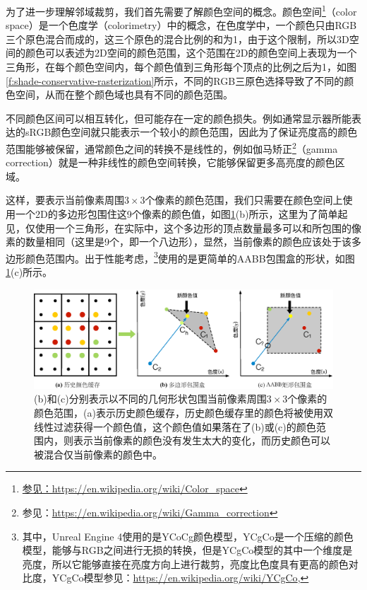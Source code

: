为了进一步理解邻域裁剪，我们首先需要了解颜色空间的概念。颜色空间\footnote{\url{参见：https://en.wikipedia.org/wiki/Color_space}}（color space）是一个色度学（colorimetry）中的概念，在色度学中，一个颜色只由RGB三个原色混合而成的，这三个原色的混合比例的和为1，由于这个限制，所以3D空间的颜色可以表述为2D空间的颜色范围，这个范围在2D的颜色空间上表现为一个三角形，在每个颜色空间内，每个颜色值到三角形每个顶点的比例之后为1，如图\ref{f:shade-conservative-rasterization}所示，不同的RGB三原色选择导致了不同的颜色空间，从而在整个颜色域也具有不同的颜色范围。

不同颜色区间可以相互转化，但可能存在一定的颜色损失。例如通常显示器所能表达的sRGB颜色空间就只能表示一个较小的颜色范围，因此为了保证亮度高的颜色范围能够被保留，通常颜色之间的转换不是线性的，例如伽马矫正\footnote{参见：\url{https://en.wikipedia.org/wiki/Gamma_correction}}（gamma correction）就是一种非线性的颜色空间转换，它能够保留更多高亮度的颜色区域。

这样，要表示当前像素周围$3\times 3$个像素的颜色范围，我们只需要在颜色空间上使用一个2D的多边形包围住这9个像素的颜色值，如图\ref{f:shade-clamping}(b)所示，这里为了简单起见，仅使用一个三角形，在实际中，这个多边形的顶点数量最多可以和所包围的像素的数量相同（这里是9个，即一个八边形），显然，当前像素的颜色应该处于该多边形颜色范围内。出于性能考虑，\cite{a:AnExcursioninTemporalSupersampling,a:RealtimeglobalilluminationandreflectionsinDust514,a:TemporalAntialiasingInUncharted4}\footnote{其中，Unreal Engine 4使用的是YCoCg颜色模型，YCgCo是一个压缩的颜色模型，能够与RGB之间进行无损的转换，但是YCgCo模型的其中一个维度是亮度，所以它能够直接在亮度方向上进行裁剪，亮度比色度具有更高的颜色对比度，YCgCo模型参见：\url{https://en.wikipedia.org/wiki/YCgCo},}使用的是更简单的AABB包围盒的形状，如图\ref{f:shade-clamping}(c)所示。

\begin{figure}
\begin{fullwidth}
	\includegraphics[width=\thewidth]{figures/shade/clamping}
	\caption{(b)和(c)分别表示以不同的几何形状包围当前像素周围$3\times 3$个像素的颜色范围，(a)表示历史颜色缓存，历史颜色缓存里的颜色将被使用双线性过滤获得一个颜色值，这个颜色值如果落在了(b)或(c)的颜色范围内，则表示当前像素的颜色没有发生太大的变化，而历史颜色可以被混合仅当前像素的颜色中。}
	\label{f:shade-clamping}
\end{fullwidth}
\end{figure}

